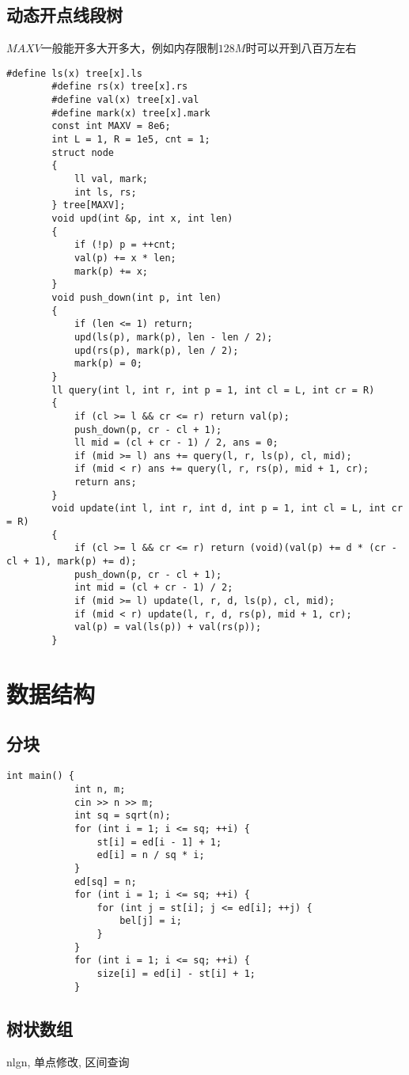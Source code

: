 \documentclass[12pt, a4paper]{ctexart}
\begin{document}
	\subsection{动态开点线段树}
	$MAXV$一般能开多大开多大，例如内存限制$128M$时可以开到八百万左右
	\begin{lstlisting}[caption={}]
		#define ls(x) tree[x].ls
		#define rs(x) tree[x].rs
		#define val(x) tree[x].val
		#define mark(x) tree[x].mark
		const int MAXV = 8e6;
		int L = 1, R = 1e5, cnt = 1;
		struct node
		{
			ll val, mark;
			int ls, rs;
		} tree[MAXV];
		void upd(int &p, int x, int len)
		{
			if (!p) p = ++cnt;
			val(p) += x * len;
			mark(p) += x;
		}
		void push_down(int p, int len)
		{
			if (len <= 1) return;
			upd(ls(p), mark(p), len - len / 2);
			upd(rs(p), mark(p), len / 2);
			mark(p) = 0;
		}
		ll query(int l, int r, int p = 1, int cl = L, int cr = R)
		{
			if (cl >= l && cr <= r) return val(p);
			push_down(p, cr - cl + 1);
			ll mid = (cl + cr - 1) / 2, ans = 0;
			if (mid >= l) ans += query(l, r, ls(p), cl, mid);
			if (mid < r) ans += query(l, r, rs(p), mid + 1, cr);
			return ans;
		}
		void update(int l, int r, int d, int p = 1, int cl = L, int cr = R)
		{
			if (cl >= l && cr <= r) return (void)(val(p) += d * (cr - cl + 1), mark(p) += d);
			push_down(p, cr - cl + 1);
			int mid = (cl + cr - 1) / 2;
			if (mid >= l) update(l, r, d, ls(p), cl, mid);
			if (mid < r) update(l, r, d, rs(p), mid + 1, cr);
			val(p) = val(ls(p)) + val(rs(p));
		}
	\end{lstlisting}
	\section{数据结构}
	\subsection{分块}
	\begin{lstlisting}[caption={}]
		int main() {
			int n, m;
			cin >> n >> m;
			int sq = sqrt(n);
			for (int i = 1; i <= sq; ++i) {
				st[i] = ed[i - 1] + 1;
				ed[i] = n / sq * i;
			}
			ed[sq] = n;
			for (int i = 1; i <= sq; ++i) {
				for (int j = st[i]; j <= ed[i]; ++j) {
					bel[j] = i;
				}
			}
			for (int i = 1; i <= sq; ++i) {
				size[i] = ed[i] - st[i] + 1;
			}
	\end{lstlisting}
	\subsection{树状数组}
	nlgn, 单点修改, 区间查询
	
\end{document}
